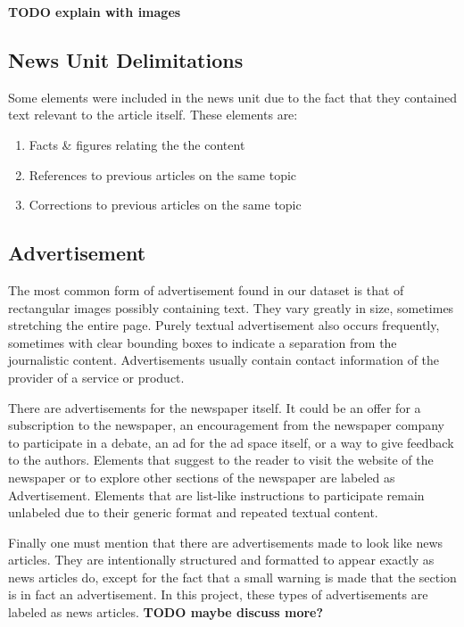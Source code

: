 \documentclass[english, bibtex]{kththesis}
\begin{document}
\textbf{TODO explain with images}

\subsection{News Unit Delimitations}

Some elements were included in the news unit due to the fact that they contained text relevant to the article itself. These elements are:

\begin{enumerate}
\item Facts \& figures relating the the content
\item References to previous articles on the same topic
\item Corrections to previous articles on the same topic
\end{enumerate}

\subsection{Advertisement}

The most common form of advertisement found in our dataset is that of rectangular images possibly containing text. They vary greatly in size, sometimes stretching the entire page. Purely textual advertisement also occurs frequently, sometimes with clear bounding boxes to indicate a separation from the journalistic content. Advertisements usually contain contact information of the provider of a service or product. 

There are advertisements for the newspaper itself. It could be an offer for a subscription to the newspaper, an encouragement from the newspaper company to participate in a debate, an ad for the ad space itself, or a way to give feedback to the authors. Elements that suggest to the reader to visit the website of the newspaper or to explore other sections of the newspaper are labeled as Advertisement. Elements that are list-like instructions to participate remain unlabeled due to their generic format and repeated textual content.

Finally one must mention that there are advertisements made to look like news articles. They are intentionally structured and formatted to appear exactly as news articles do, except for the fact that a small warning is made that the section is in fact an advertisement. In this project, these types of advertisements are labeled as news articles. \textbf{TODO maybe discuss more?}
\end{document}
